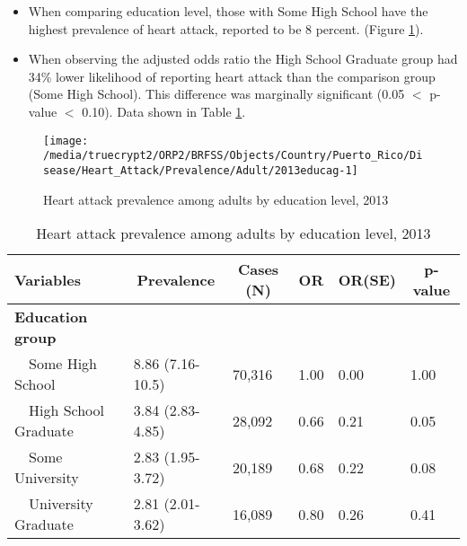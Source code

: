 \newpage
\begin{itemize}

\item When comparing education level, those with Some High School have the highest prevalence of heart attack, reported to be 8 percent. (Figure \ref{fig:edu.Heart_Attack.2013}).

\item 
When observing the adjusted odds ratio the High School Graduate group had 34\% lower likelihood of reporting heart attack than the comparison group (Some High School).
This difference was marginally significant (0.05 $<$ p-value $<$ 0.10).  Data shown in Table \ref{tab:edu.Heart_Attack.2013}.

\end{itemize}

\begin{figure}[H]
\caption{Heart attack prevalence among adults by education level, 
         2013}
\begin{knitrout}
\color{fgcolor}

{\centering \texttt{[image: /media/truecrypt2/ORP2/BRFSS/Objects/Country/Puerto\_Rico/Disease/Heart\_Attack/Prevalence/Adult/2013educag-1]} 

}



\end{knitrout}
 \label{fig:edu.Heart_Attack.2013}
\end{figure}

\begin{table}[H]
\caption{Heart attack prevalence  among adults by education level, 2013\label{tab:edu.Heart_Attack.2013}} 
\begin{center}
\begin{tabular}{llllll}
\hline\hline
\multicolumn{1}{l}{Variables}&\multicolumn{1}{c}{Prevalence}&\multicolumn{1}{c}{Cases (N)}&\multicolumn{1}{c}{OR}&\multicolumn{1}{c}{OR(SE)}&\multicolumn{1}{c}{p-value}\tabularnewline
\hline
{\bfseries Education group}&&&&&\tabularnewline
~~Some High School&8.86 (7.16-10.5)&70,316&1.00&0.00&1.00\tabularnewline
~~High School Graduate&3.84 (2.83-4.85)&28,092&0.66&0.21&0.05\tabularnewline
~~Some University&2.83 (1.95-3.72)&20,189&0.68&0.22&0.08\tabularnewline
~~University Graduate&2.81 (2.01-3.62)&16,089&0.80&0.26&0.41\tabularnewline
\hline
\end{tabular}\end{center}

\end{table}

